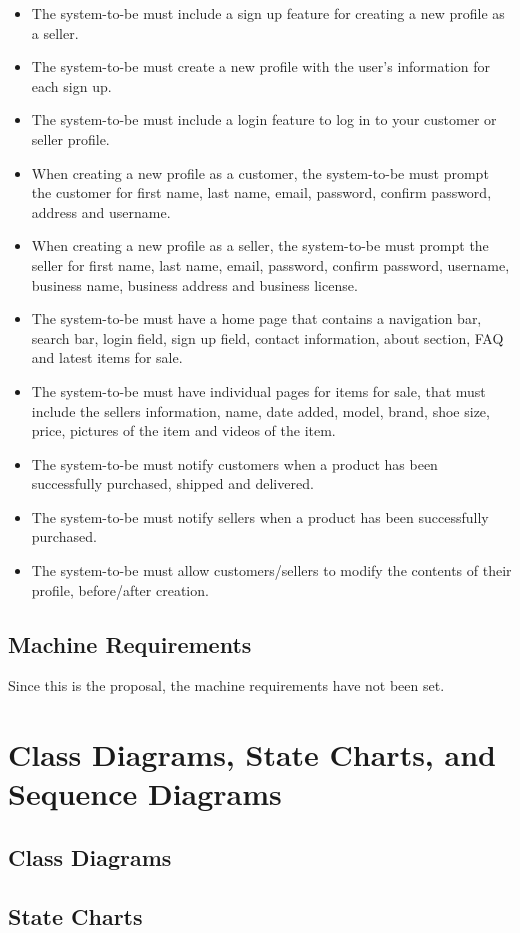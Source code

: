 \begin{itemize}
  \item The system-to-be must include a sign up feature for creating a new profile as a seller.
  \item The system-to-be must create a new profile with the user's information for each sign up.
  \item The system-to-be must include a login feature to log in to your customer or seller profile.
  \item When creating a new profile as a customer, the system-to-be must prompt the customer for first name, last name, email, password, confirm password, address and username.
  \item When creating a new profile as a seller, the system-to-be must prompt the seller for first name, last name, email, password, confirm password, username, business name, business address and business license.
  \item The system-to-be must have a home page that contains a navigation bar, search bar, login field, sign up field, contact information, about section, FAQ and latest items for sale.
  \item The system-to-be must have individual pages for items for sale, that must include the sellers information, name, date added, model, brand, shoe size, price, pictures of the item and videos of the item.
  \item The system-to-be must notify customers when a product has been successfully purchased, shipped and delivered.
  \item The system-to-be must notify sellers when a product has been successfully purchased.
  \item The system-to-be must allow customers/sellers to modify the contents of their profile, before/after creation.
\end{itemize}
\subsection{Machine Requirements}
Since this is the proposal, the machine requirements have not been set.
\section{Class Diagrams, State Charts, and Sequence Diagrams}
\subsection{Class Diagrams}
\subsection{State Charts}
